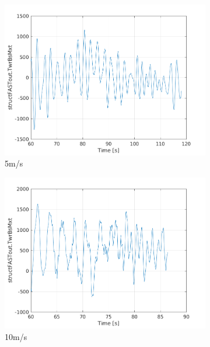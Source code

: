 \documentclass[10pt]{article}
\begin{document}
\begin{figure}[H]
  \centering
\begin{subfigure}{0.40\textwidth}
  \includegraphics[width=1\linewidth]{../CIP_6/FAST/Plots_ws5/TwrBsMxt.png}
  \caption{5m/s}
\end{subfigure}
\begin{subfigure}{0.40\textwidth}
  \includegraphics[width=1\linewidth]{../CIP_6/FAST/Plots_ws10/TwrBsMxt.png}
  \caption{10m/s}
\end{subfigure}
\begin{subfigure}{0.40\textwidth}

\end{subfigure}
\end{figure}
\end{document}
